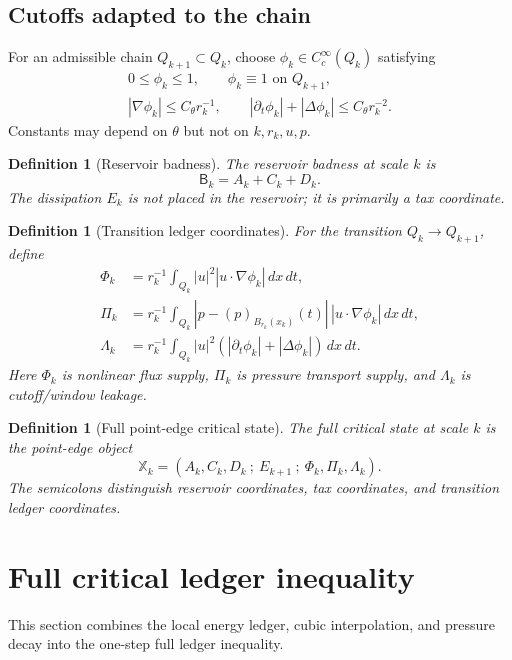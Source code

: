 \documentclass[11pt]{article}
\numberwithin{equation}{section}
\newtheorem{definition}[theorem]{Definition}
\newcommand{\Bbad}{\mathsf B}
\newcommand{\dd}{\,d}
\begin{document}
\subsection{Cutoffs adapted to the chain}

For an admissible chain $Q_{k+1}\subset Q_k$, choose $\phi_k\in C_c^\infty(Q_k)$ satisfying
\begin{align*}
0\leq\phi_k\leq1,
\qquad
\phi_k\equiv1 \text{ on }Q_{k+1},\\
|\nabla\phi_k|\leq C_\theta r_k^{-1},
\qquad
|\partial_t\phi_k|+|\Delta\phi_k|\leq C_\theta r_k^{-2}.
\end{align*}
Constants may depend on $\theta$ but not on $k,r_k,u,p$.

\begin{definition}[Reservoir badness]\label{def:reservoir}
The reservoir badness at scale $k$ is
\[
\Bbad_k=A_k+C_k+D_k.
\]
The dissipation $E_k$ is not placed in the reservoir; it is primarily a tax coordinate.
\end{definition}

\begin{definition}[Transition ledger coordinates]\label{def:transition-ledger}
For the transition $Q_k\to Q_{k+1}$, define
\begin{align}
\Phi_k
&=r_k^{-1}\int_{Q_k}|u|^2|u\cdot\nabla\phi_k|\dd x\dd t,
\label{eq:Phi}\\
\Pi_k
&=r_k^{-1}\int_{Q_k}|p-(p)_{B_{r_k}(x_k)}(t)|\,|u\cdot\nabla\phi_k|\dd x\dd t,
\label{eq:Pi}\\
\Lambda_k
&=r_k^{-1}\int_{Q_k}|u|^2\left(|\partial_t\phi_k|+|\Delta\phi_k|\right)\dd x\dd t.
\label{eq:Lambda}
\end{align}
Here $\Phi_k$ is nonlinear flux supply, $\Pi_k$ is pressure transport supply, and $\Lambda_k$ is cutoff/window leakage.
\end{definition}

\begin{definition}[Full point-edge critical state]\label{def:full-state}
The full critical state at scale $k$ is the point-edge object
\[
\mathbb X_k=(A_k,C_k,D_k\ ;\ E_{k+1}\ ;\ \Phi_k,\Pi_k,\Lambda_k).
\]
The semicolons distinguish reservoir coordinates, tax coordinates, and transition ledger coordinates.
\end{definition}

\section{Full critical ledger inequality}\label{sec:full-ledger-ineq}
\noindent This section combines the local energy ledger, cubic interpolation, and pressure decay into the one-step full ledger inequality.
\end{document}
